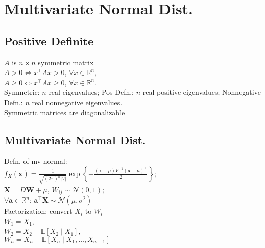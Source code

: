 \section{Multivariate Normal Dist.}
	\subsection*{Positive Definite}
	$A$ is $n\times n$ symmetric matrix\\
	$A > 0\iff x^{\intercal}Ax > 0$, $\forall x\in\mathbb{R}^{n}$,\\
	$A\geq 0\iff x^{\intercal}Ax\geq 0$, $\forall x\in\mathbb{R}^{n}$.\\
	Symmetric: $n$ real eigenvalues; Pos Defn.: $n$ real positive eigenvalues; Nonnegative Defn.: $n$ real nonnegative eigenvalues.\\
	Symmetric matrices are diagonalizable
	
	\subsection*{Multivariate Normal Dist.}
	Defn. of mv normal:\\
	$f_{X}\left(\mathbf{x}\right) = \frac{1}{\sqrt{\left(2\pi\right)^{n}\left|V\right|}}\exp\left\{-\frac{\left(\mathbf{x} - \mu\right)V^{-1}\left(\mathbf{x} - \mu\right)^{\intercal}}{2}\right\}$;\\
	$\mathbf{X} = D\mathbf{W} + \mu$, $W_{ij}\sim\mathcal{N}\left(0, 1\right)$;\\
	$\forall\mathbf{a}\in\mathbb{R}^{n}$: $\mathbf{a}^{\intercal}\mathbf{X}\sim\mathcal{N}\left(\mu, \sigma^{2}\right)$\\
	Factorization: convert $X_{i}$ to $W_{i}$\\
	$W_{1} = X_{1}$,\\
	$W_{2} = X_{2} - \mathbb{E}\left[X_{2}\mid X_{1}\right]$,\\
	$W_{n} = X_{n} - \mathbb{E}\left[X_{n}\mid X_{1},\dots,X_{n-1}\right]$
	
